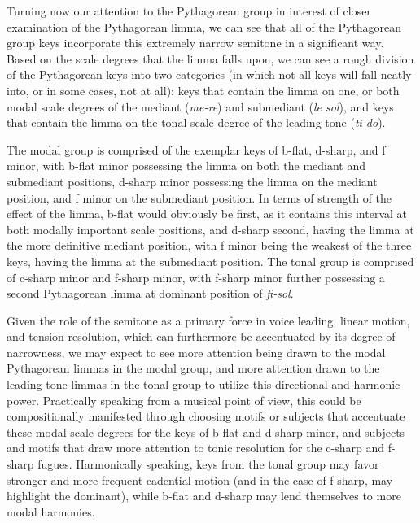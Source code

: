Turning now our attention to the Pythagorean group in interest of closer
examination of the Pythagorean limma, we can see that all of the
Pythagorean group keys incorporate this extremely narrow semitone in a
significant way. Based on the scale degrees that the limma falls upon,
we can see a rough division of the Pythagorean keys into two categories
(in which not all keys will fall neatly into, or in some cases, not at
all): keys that contain the limma on one, or both modal scale degrees of
the mediant (\emph{me-re}) and submediant (\emph{le sol}), and keys that
contain the limma on the tonal scale degree of the leading tone
(\emph{ti-do}).

The modal group is comprised of the exemplar keys of b-flat, d-sharp,
and f minor, with b-flat minor possessing the limma on both the mediant
and submediant positions, d-sharp minor possessing the limma on the
mediant position, and f minor on the submediant position. In terms of
strength of the effect of the limma, b-flat would obviously be first, as
it contains this interval at both modally important scale positions, and
d-sharp second, having the limma at the more definitive mediant
position, with f minor being the weakest of the three keys, having the
limma at the submediant position. The tonal group is comprised of
c-sharp minor and f-sharp minor, with f-sharp minor further possessing a
second Pythagorean limma at dominant position of \emph{fi-sol}.

Given the role of the semitone as a primary force in voice leading,
linear motion, and tension resolution, which can furthermore be
accentuated by its degree of narrowness, we may expect to see more
attention being drawn to the modal Pythagorean limmas in the modal
group, and more attention drawn to the leading tone limmas in the tonal
group to utilize this directional and harmonic power. Practically
speaking from a musical point of view, this could be compositionally
manifested through choosing motifs or subjects that accentuate these
modal scale degrees for the keys of b-flat and d-sharp minor, and
subjects and motifs that draw more attention to tonic resolution for the
c-sharp and f-sharp fugues. Harmonically speaking, keys from the tonal
group may favor stronger and more frequent cadential motion (and in the
case of f-sharp, may highlight the dominant), while b-flat and d-sharp
may lend themselves to more modal harmonies.

